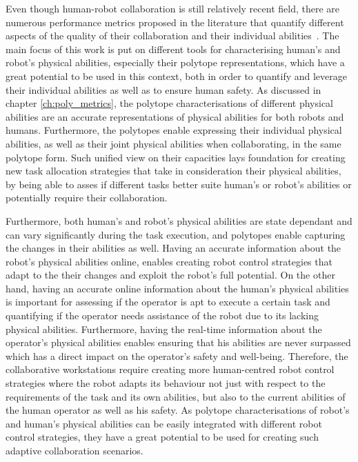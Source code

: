 Even though human-robot collaboration is still relatively recent field, there are numerous performance metrics proposed in the literature that quantify different aspects of the quality of their collaboration and their individual abilities~\cite{CORONADO2022collab_quality}.
The main focus of this work is put on different tools for characterising human's and robot's physical abilities, especially their polytope representations, which have a great potential to be used in this context, both in order to quantify and leverage their individual abilities as well as to ensure human safety. As discussed in chapter \ref{ch:poly_metrics}, the polytope characterisations of different physical abilities are an accurate representations of physical abilities for both robots and humans. Furthermore, the polytopes enable expressing their individual physical abilities, as well as their joint physical abilities when collaborating, in the same polytope form. Such unified view on their capacities lays foundation for creating new task allocation strategies that take in consideration their physical abilities, by being able to asses if different tasks better suite human's or robot's abilities or potentially require their collaboration. 

Furthermore, both human's and robot's physical abilities are state dependant and can vary significantly during the task execution, and polytopes enable capturing the changes in their abilities as well. Having an accurate information about the robot's physical abilities online, enables creating robot control strategies that adapt to the their changes and exploit the robot's full potential. On the other hand, having an accurate online information about the human's physical abilities is important for assessing if the operator is apt to execute a certain task and quantifying if the operator needs assistance of the robot due to its lacking physical abilities. Furthermore, having the real-time information about the operator's physical abilities enables ensuring that his abilities are never surpassed which has a direct impact on the operator's safety and well-being. Therefore, the collaborative workstations require creating more human-centred robot control strategies where the robot adapts its behaviour not just with respect to the requirements of the task and its own abilities, but also to the current abilities of the human operator as well as his safety. As polytope characterisations of robot's and human's physical abilities can be easily integrated with different robot control strategies, they have a great potential to be used for creating such adaptive collaboration scenarios.

